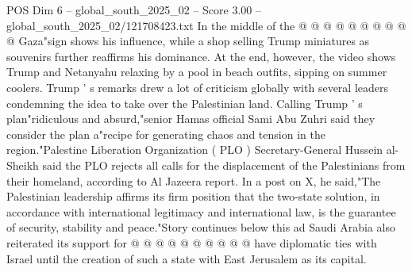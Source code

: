 \begin{textsample}{POS Dim 6 – global\_south\_2025\_02 – Score 3.00 – global\_south\_2025\_02/121708423.txt}
In the middle of the @ @ @ @ @ @ @ @ @ @ Gaza"sign shows his influence, while a shop selling Trump miniatures as souvenirs further reaffirms his dominance.
At the end, however, the video shows Trump and Netanyahu relaxing by a pool in beach outfits, sipping on summer coolers.
Trump ' s remarks drew a lot of criticism globally with several leaders condemning the idea to take over the Palestinian land.
Calling Trump ' s plan"ridiculous and absurd,"senior Hamas official Sami Abu Zuhri said they consider the plan a"recipe for generating chaos and tension in the region."Palestine Liberation Organization ( PLO ) Secretary-General Hussein al-Sheikh said the PLO rejects all calls for the displacement of the Palestinians from their homeland, according to Al Jazeera report.
In a post on X, he said,"The Palestinian leadership affirms its firm position that the two-state solution, in accordance with international legitimacy and international law, is the guarantee of security, stability and peace."Story continues below this ad Saudi Arabia also reiterated its support for @ @ @ @ @ @ @ @ @ @ have diplomatic ties with Israel until the creation of such a state with East Jerusalem as its capital.

\end{textsample}
